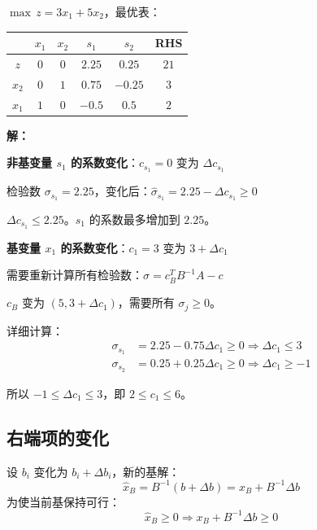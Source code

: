 \begin{example}[$c_k$ 灵敏度分析]
$\max \, z = 3x_1 + 5x_2$，最优表：

\begin{table}[H]
\centering
\begin{tabular}{@{}c|cccc|c@{}}
\toprule
& $x_1$ & $x_2$ & $s_1$ & $s_2$ & RHS \\
\midrule
$z$ & $0$ & $0$ & $2.25$ & $0.25$ & $21$ \\
\midrule
$x_2$ & $0$ & $1$ & $0.75$ & $-0.25$ & $3$ \\
$x_1$ & $1$ & $0$ & $-0.5$ & $0.5$ & $2$ \\
\bottomrule
\end{tabular}
\end{table}

\textbf{解：}

\textbf{非基变量 $s_1$ 的系数变化}：$c_{s_1} = 0$ 变为 $\Delta c_{s_1}$

检验数 $\sigma_{s_1} = 2.25$，变化后：$\hat{\sigma}_{s_1} = 2.25 - \Delta c_{s_1} \geq 0$

$\Delta c_{s_1} \leq 2.25$。$s_1$ 的系数最多增加到 $2.25$。

\textbf{基变量 $x_1$ 的系数变化}：$c_1 = 3$ 变为 $3 + \Delta c_1$

需要重新计算所有检验数：$\sigma = c_B^T B^{-1} A - c$

$c_B$ 变为 $(5, 3+\Delta c_1)$，需要所有 $\sigma_j \geq 0$。

详细计算：
\begin{align*}
\sigma_{s_1} &= 2.25 - 0.75\Delta c_1 \geq 0 \Rightarrow \Delta c_1 \leq 3 \\
\sigma_{s_2} &= 0.25 + 0.25\Delta c_1 \geq 0 \Rightarrow \Delta c_1 \geq -1
\end{align*}

所以 $-1 \leq \Delta c_1 \leq 3$，即 $2 \leq c_1 \leq 6$。
\end{example}

\subsection{右端项的变化}

\begin{theorem}[$b_i$ 的变化范围]
设 $b_i$ 变化为 $b_i + \Delta b_i$，新的基解：
\[
\hat{x}_B = B^{-1}(b + \Delta b) = x_B + B^{-1}\Delta b
\]
为使当前基保持可行：
\[
\hat{x}_B \geq 0 \Rightarrow x_B + B^{-1}\Delta b \geq 0
\]
\end{theorem}

